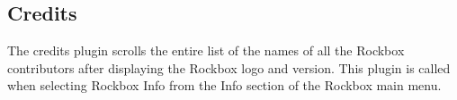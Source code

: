 \subsection{Credits}
The credits plugin scrolls the entire list of the names of all the Rockbox
contributors after displaying the Rockbox logo and version. This plugin is
called when selecting Rockbox Info from the Info section of the Rockbox main
menu.
